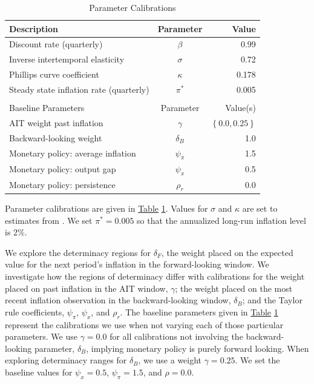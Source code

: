 \documentclass[english,authoryear,12pt]{elsarticle}
\begin{document}
\begin{table}[htp]
	\captionsetup{justification=centering}
	\caption{Parameter Calibrations}\label{tb:parms}
	\begin{center}
		\vspace*{-1pc}\begin{tabular}{lcr}
			Description & Parameter & Value \\ \hline
			Discount rate (quarterly) & $\beta$ & 0.99 \\
			Inverse intertemporal elasticity & $\sigma$ & 0.72 \\
			Phillips curve coefficient & $\kappa$ & 0.178 \\
			Steady state inflation rate (quarterly) & $\pi^*$ & 0.005 \\ [0.25pc]
			\hline \\ [-0.25pc]
			Baseline Parameters & Parameter & Value(s) \\ \hline
			AIT weight past inflation & $\gamma$ & $\left\{ 0.0, 0.25 \right\}$ \\
			Backward-looking weight & $\delta_B$ & 1.0 \\
			Monetary policy: average inflation & $\psi_\pi$ & 1.5 \\
			Monetary policy: output gap & $\psi_x$ & 0.5 \\
			Monetary policy: persistence & $\rho_r$ & 0.0 \\ \hline
		\end{tabular}
	\end{center}
\end{table}

Parameter calibrations are given in \hyperref[tb:parms]{Table} \ref{tb:parms}. Values for $\sigma$ and $\kappa$ are set to estimates from \citet{smetswouters2007}. We set $\pi^*=0.005$ so that the annualized long-run inflation level is 2\%.

We explore the determinacy regions for $\delta_F$, the weight placed on the expected value for the next period's inflation in the forward-looking window. We investigate how the regions of determinacy differ with calibrations for the weight placed on past inflation in the AIT window, $\gamma$; the weight placed on the most recent inflation observation in the backward-looking window, $\delta_B$; and the Taylor rule coefficients, $\psi_\pi$, $\psi_x$, and $\rho_r$. The baseline parameters given in \href{tb:parms}{Table} \ref{tb:parms} represent the calibrations we use when not varying each of those particular parameters. We use $\gamma=0.0$ for all calibrations not involving the backward-looking parameter, $\delta_B$, implying monetary policy is purely forward looking. When exploring determinacy ranges for $\delta_B$, we use a weight $\gamma=0.25$. We set the baseline values for $\psi_x=0.5$, $\psi_\pi = 1.5$, and $\rho=0.0$.
\end{document}
